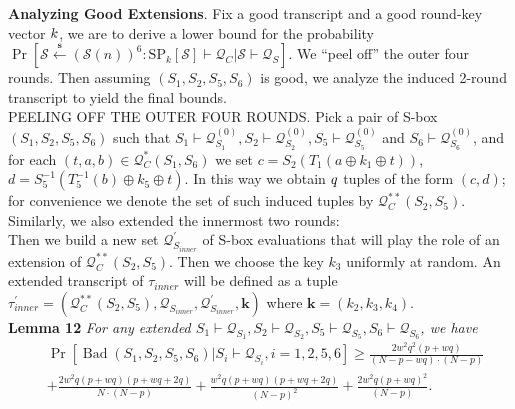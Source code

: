 
\arrangespace

\noindent \textbf{Analyzing Good Extensions}.
%
Fix a good transcript and a good round-key vector $\mathnormal{k}$, we are to derive a lower bound for the probability  $\operatorname{Pr}\left[\mathcal{S} \stackrel{\mathbf{s}}{\leftarrow}(\mathcal{S}(n))^{6}: \mathrm{SP}_{k}[\mathcal{S}] \vdash \mathcal{Q}_{C} | \mathcal{S} \vdash \mathcal{Q}_{S}\right]$. We ``peel off'' the outer four rounds. Then assuming $(S_{1}, S_2, S_{5}, S_6)$ is good, we analyze the induced 2-round transcript to yield the final bounds.\\

\noindent
\textsc{PEELING OFF THE OUTER FOUR ROUNDS}. Pick a pair of S-box $(S_1, S_2, S_{5}, S_6)$ such that $S_{1} \vdash \mathcal{Q}_{S_{1}}^{(0)}, S_{2} \vdash \mathcal{Q}_{S_{2}}^{(0)}, S_{5} \vdash \mathcal{Q}_{S_{5}}^{(0)}$   and $S_{6} \vdash \mathcal{Q}_{S_{6}}^{(0)}$, and for each $ (t, a, b) \in \mathcal{Q}_{C}^{*}\left(S_{1}, S_{6}\right)$ we set $c=S_{2}\left(T_1\left(a \oplus k_{1} \oplus t\right)\right)$, $d=S_{5}^{-1}\left(T_5^{-1}\left(b\right) \oplus k_{5} \oplus t\right)$. In this way we obtain $\mathnormal{q}$ tuples of the form $(c, d)$; for convenience we denote the set of such induced tuples by $\mathcal{Q}_{C}^{**}\left(S_{2}, S_{5}\right)$. Similarly, we also extended the innermost two rounds:\\

Then we build a new set $\mathcal{Q}_{S_{inner}}^{\prime}$ of S-box evaluations that will play the role of an extension of $\mathcal{Q}_{C}^{**}\left(S_{2}, S_{5}\right)$. Then we choose the key $k_3$ uniformly at random. An extended transcript of $\tau_{inner}$ will be defined as a tuple $\tau_{inner}^{\prime}=\left(\mathcal{Q}_{C}^{**}\left(S_{2}, S_{5}\right), \mathcal{Q}_{S_{inner}}, \mathcal{Q}_{S_{inner}}^{\prime}, \mathbf{k}\right)$ where $\mathbf{k}=\left(k_{2}, k_{3}, k_{4}\right)$.\\

\noindent \textbf{Lemma 12} \emph{ For any extended $S_{1} \vdash \mathcal{Q}_{S_{1}}, S_{2} \vdash \mathcal{Q}_{S_{2}}, S_{5} \vdash \mathcal{Q}_{S_{5}}, S_{6} \vdash \mathcal{Q}_{S_{6}}$, we have}
\begin{equation}
\begin{aligned}
&\operatorname{Pr}\left[\operatorname{Bad}\left(S_{1}, S_2, S_{5}, S_6\right) | S_{i} \vdash \mathcal{Q}_{S_{i}}, i = 1, 2, 5, 6\right] \geq \frac{2 w^{2} q^{2} (p+w q)}{(N- p- wq) \cdot (N-p)}\\
& +\frac{2 w^{2} q (p+w q)(p+w q+2 q)}{N \cdot (N-p)} +\frac{w^{2} q (p+w q)(p+w q+2 q)}{(N-p)^2} +\frac{2 w^{2} q (p+w q)^{2}}{(N-p)}.
\end{aligned}
\end{equation}

